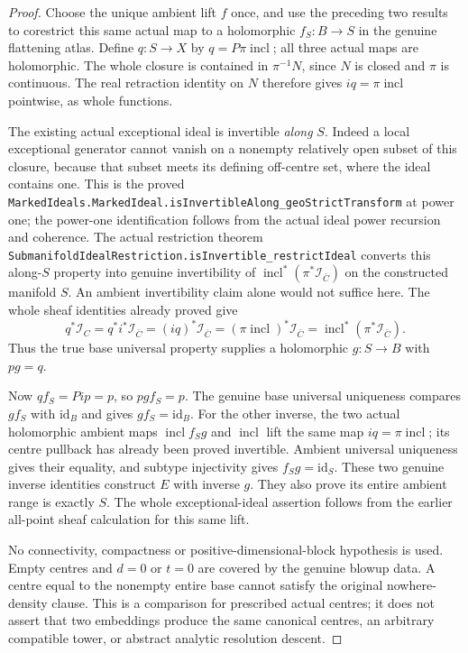 \begin{proof}
Choose the unique ambient lift $f$ once, and use the preceding two results
to corestrict this same actual map to a holomorphic $f_S:B\to S$ in the
genuine flattening atlas. Define $q:S\to X$ by
$q=P\pi\operatorname{incl}$; all three actual maps are holomorphic.
The whole closure is contained in $\pi^{-1}N$, since $N$ is closed and
$\pi$ is continuous. The real retraction identity on $N$ therefore gives
$iq=\pi\operatorname{incl}$ pointwise, as whole functions.

The existing actual exceptional ideal is invertible \emph{along} $S$.
Indeed a local exceptional generator cannot vanish on a nonempty
relatively open subset of this closure, because that subset meets its
defining off-centre set, where the ideal contains one. This is the proved
\texttt{MarkedIdeals.MarkedIdeal.isInvertibleAlong\_geoStrictTransform}
at power one; the power-one identification follows from the actual ideal
power recursion and coherence. The actual restriction theorem
\texttt{SubmanifoldIdealRestriction.isInvertible\_restrictIdeal} converts
this along-$S$ property into genuine invertibility of
$\operatorname{incl}^*(\pi^*\mathcal I_{\bar C})$ on the constructed
manifold $S$. An ambient invertibility claim alone would not suffice here.
The whole sheaf identities already proved give
\[
 q^*\mathcal I_C=q^*i^*\mathcal I_{\bar C}
 =(iq)^*\mathcal I_{\bar C}
 =(\pi\operatorname{incl})^*\mathcal I_{\bar C}
 =\operatorname{incl}^*(\pi^*\mathcal I_{\bar C}).
\]
Thus the true base universal property supplies a holomorphic
$g:S\to B$ with $pg=q$.

Now $qf_S=Pip=p$, so $pgf_S=p$. The genuine base universal uniqueness
compares $gf_S$ with $\mathrm{id}_B$ and gives $gf_S=\mathrm{id}_B$.
For the other inverse, the two actual holomorphic ambient maps
$\operatorname{incl}f_Sg$ and $\operatorname{incl}$ lift the same map
$iq=\pi\operatorname{incl}$; its centre pullback has already been proved
invertible. Ambient universal uniqueness gives their equality, and subtype
injectivity gives $f_Sg=\mathrm{id}_S$. These two genuine inverse identities
construct $E$ with inverse $g$. They also prove its entire ambient range
is exactly $S$. The whole exceptional-ideal assertion follows from the
earlier all-point sheaf calculation for this same lift.

No connectivity, compactness or positive-dimensional-block hypothesis is
used. Empty centres and $d=0$ or $t=0$ are covered by the genuine blowup
data. A centre equal to the nonempty entire base cannot satisfy the original
nowhere-density clause. This is a comparison for prescribed actual centres;
it does not assert that two embeddings produce the same canonical centres,
an arbitrary compatible tower, or abstract analytic resolution descent.
\end{proof}
